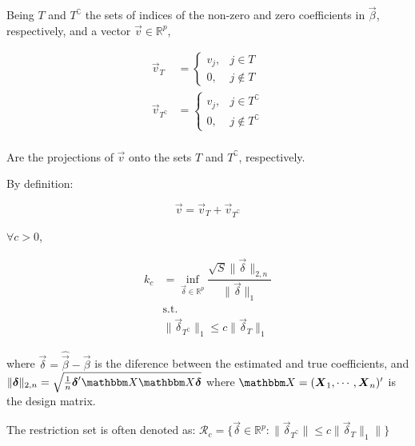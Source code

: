 \begin{Def}
Being $T$ and $T^{\complement}$ the sets of indices of the non-zero and zero coefficients in $\Vec{\beta}$, respectively, and a vector $\Vec{v} \in \mathbb{R}^p$, 

\begin{align*}
    \Vec{v}_T &= \begin{cases}
        v_j, &  j \in T \\
        0, &  j \notin T
    \end{cases}\\
    \Vec{v}_{T^{\complement}} &= \begin{cases}
        v_j, &  j \in T^{\complement}\\
        0, &  j \notin T^{\complement}
    \end{cases}\\
\end{align*}

Are the projections of $\Vec{v}$ onto the sets $T$ and $T^{\complement}$, respectively.

By definition:

\[
\Vec{v} = \Vec{v}_T + \Vec{v}_{T^{\complement}}
\]
\end{Def}

\begin{Def}
$\forall c > 0$,

\begin{align*}
k_c &= \inf_{\Vec{\delta} \in \mathbb{R}^p}{
    \dfrac{\sqrt{S} \|\Vec{\delta}\|_{2, n}}{\|\Vec{\delta}\|_1}
}\\
&\text{s.t.}\\
&\|\Vec{\delta}_{T^{\complement}}\|_1 \leq c \|\Vec{\delta}_T\|_1
\end{align*}

where $\Vec{\delta} = \hat{\Vec{\beta}} - \Vec{\beta}$ is the diference between the estimated and true coefficients, and $\|\Vec{\delta}\|_{2, n} = \sqrt{\frac{1}{n} \Vec{\delta}'\Mat{X}\Mat{X}\Vec{\delta}}$ where $\Mat{X} = (\Vec{X}_1, \cdots, \Vec{X}_n)'$ is the design matrix.

The restriction set is often denoted as:
$\mathcal{R}_{c} = \{\Vec{\delta} \in \mathbb{R}^p: \|\Vec{\delta}_{T^\complement}\| \leq c \|\Vec{\delta}_T\|_1\|\}$
\end{Def}


